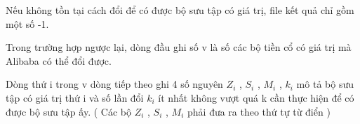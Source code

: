 Nếu không tồn tại cách đổi để có được bộ sưu tập có giá trị, file kết quả chỉ gồm một số -1.

Trong trường hợp ngược lại, dòng đầu ghi số v là số các bộ tiền cổ có giá trị mà Alibaba có thể đổi được.

Dòng thứ i trong v dòng tiếp theo ghi 4 số nguyên $Z_{i}$ , $S_{i}$ , $M_{i}$ , $k_{i}$ mô tả bộ sưu tập có giá trị thứ i và số lần đổi $k_{i}$ ít nhất không vượt quá k cần thực hiện để có được bộ sưu tập ấy. ( Các bộ $Z_{i}$ , $S_{i}$ , $M_{i}$ phải đưa ra theo thứ tự từ điển )